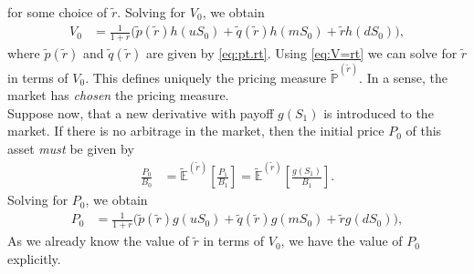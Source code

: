 \documentclass[12pt]{book}
\numberwithin{equation}{chapter}
\theoremstyle{plain}
\numberwithin{theorem}{section}
\theoremstyle{definition}
\numberwithin{exercise}{chapter}
\newcommand{\<}{\langle}
\renewcommand{\>}{\rangle}
\renewcommand{\(}{\left(}
\renewcommand{\)}{\right)}
\renewcommand{\[}{\left[}
\renewcommand{\]}{\right]}
\newcommand\Eb{\mathds{E}}
\newcommand\Pb{\mathds{P}}
\newcommand\Ebt{\widetilde{\Eb}}
\newcommand\Pbt{\widetilde{\Pb}}
\newcommand\qt{\widetilde{q}}
\newcommand\rt{\widetilde{r}}
\theoremstyle{definition}
\numberwithin{question}{section}
\newcommand\pt{\widetilde{p}}
\begin{document}
for some choice of $\rt$.  Solving for $V_0$, we obtain
\begin{align}
V_0 
	&= \frac{1}{1+r} \Big( \pt (\rt) h(u S_0) + \qt (\rt) h(m S_0) + \rt h(d S_0) \Big) , \label{eq:V=rt}
\end{align}
where $\pt(\rt)$ and $\qt(\rt)$ are given by \eqref{eq:pt.rt}.
Using \eqref{eq:V=rt} we can solve for $\rt$ in terms of $V_0$. This defines uniquely the pricing measure $\Pbt^{(\rt)}$.  In a sense, the market has \textit{chosen} the pricing measure.
\\[0.5em]
Suppose now, that a new derivative with payoff $g(S_1)$ is introduced to the market. If there is no arbitrage in the market, then the initial price $P_0$ of this asset \textit{must} be given by
\begin{align}
\frac{P_0}{B_0} 
	&= \Ebt^{(\rt)} \[ \frac{P_1}{B_1} \] = \Ebt^{(\rt)} \[ \frac{g(S_1)}{B_1} \] .
\end{align}
Solving for $P_0$, we obtain
\begin{align}
P_0 
	&= \frac{1}{1+r}  \Big( \pt (\rt) g(u S_0) + \qt (\rt) g(m S_0) + \rt g(d S_0) \Big) , \label{eq:P0-trinomial}
\end{align}
As we already know the value of $\rt$ in terms of $V_0$, we have the value of $P_0$ explicitly.
\end{document}
